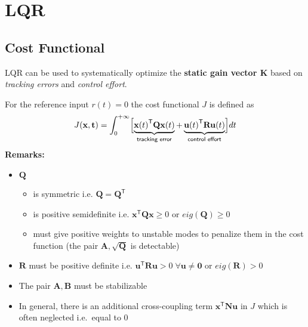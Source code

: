 \section{LQR}
\subsection{Cost Functional}
LQR can be used to systematically optimize the \textbf{static gain vector K} based on \textit{tracking errors} and \textit{control effort}.

For the reference input $r(t) = 0$ the cost functional $J$ is defined as
\noindent\begin{equation*}
    J(\mathbf{x,t})=\int_0^{+\infty} \Bigl[\underbrace{{\mathbf{x}(t)}^{\mathsf{T}}\mathbf{Qx}(t)}_{\textsf{tracking error}} + \underbrace{{\mathbf{u}(t)}^{\mathsf{T}} \mathbf{Ru}(t)}_{\textsf{control effort}} \Bigr]dt
\end{equation*}
\textbf{Remarks:}
\begin{itemize}
    \item $\mathbf{Q}$
          \begin{itemize}
              \item is symmetric i.e. $\mathbf{Q}=\mathbf{Q}^{\mathsf{T}}$
              \item is positive semidefinite i.e. $\mathbf{x}^{\mathsf{T}} \mathbf{Qx} \geq 0$ or $eig(\mathbf{Q}) \geq 0$
              \item must give positive weights to unstable modes to penalize them in the cost function (the pair $\mathbf{A}, \sqrt{\mathbf{Q}}$ is detectable)
          \end{itemize}
    \item $\mathbf{R}$ must be positive definite i.e. $\mathbf{u}^{\mathsf{T}} \mathbf{Ru} >0\; \forall \mathbf{u}\neq \mathbf{0}$ or $eig(\mathbf{R}) > 0$
    \item The pair $\mathbf{A,B}$ must be stabilizable
    \item In general, there is an additional cross-coupling term $\mathbf{x}^{\mathsf{T}}\mathbf{Nu}$ in $J$ which is often neglected i.e.\ equal to $0$
\end{itemize}

